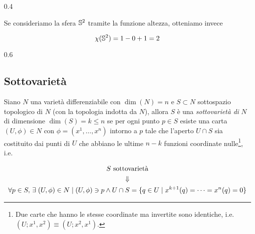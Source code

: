 	{0.4}{%
			}

Se consideriamo la sfera $ \S^{2} $ tramite la funzione altezza, otteniamo invece

\begin{equation}
	\chi(\S^{2}) = 1 - 0 + 1 = 2
\end{equation}

	{0.6}{%
			}

\subsection{Sottovarietà}

Siano $ N $ una varietà differenziabile con $ \dim(N) = n $ e $ S \subset N $ sottospazio topologico di $ N $ (con la topologia indotta da $ N $), allora $ S $ è una \textit{sottovarietà di} $ N $ di dimensione $ \dim(S) = k \leqslant n $ se per ogni punto $ p \in S $ esiste una carta $ (U,\phi) \in N $ con $ \phi = (x^{1},\dots,x^{n}) $ intorno a $ p $ tale che l'aperto $ U \cap S $ sia costituito dai punti di $ U $ che abbiano le ultime $ n-k $ funzioni coordinate nulle\footnote{%
	Due carte che hanno le stesse coordinate ma invertite sono identiche, i.e. $ (U;x^{1},x^{2}) \equiv (U;x^{2},x^{1}) $.%
}, i.e.

\begin{gather}
	S \text{ sottovarietà}\nonumber\\
	\Downarrow\\
	\forall p \in S, \, \E (U,\phi) \in N \mid (U,\phi) \ni p \wedge U \cap S = \{ q \in U \mid x^{k+1}(q) = \dots = x^{n}(q) = 0 \}\nonumber
\end{gather}

